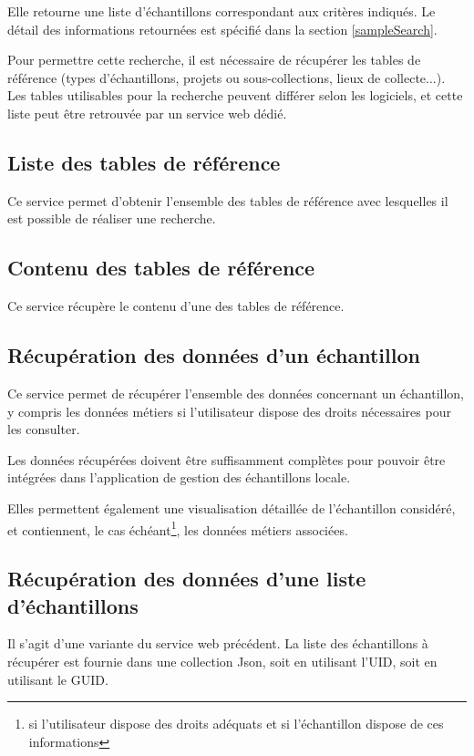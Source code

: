 Elle retourne une liste d'échantillons correspondant aux critères indiqués. Le détail des informations retournées est spécifié dans la section \ref{sampleSearch}.

Pour permettre cette recherche, il est nécessaire de récupérer les tables de référence (types d'échantillons, projets ou sous-collections, lieux de collecte...). Les tables utilisables pour la recherche peuvent différer selon les logiciels, et cette liste peut être retrouvée par un service web dédié.

\subsection{Liste des tables de référence}
Ce service permet d'obtenir l'ensemble des tables de référence avec lesquelles il est possible de réaliser une recherche.

\subsection{Contenu des tables de référence}
Ce service récupère le contenu d'une des tables de référence.

\subsection{Récupération des données d'un échantillon}
Ce service permet de récupérer l'ensemble des données concernant un échan\-tillon, y compris les données \og métiers \fg{} si l'utilisateur dispose des droits néces\-saires pour les consulter.

Les données récupérées doivent être suffisamment complètes pour pouvoir être intégrées dans l'application de gestion des échantillons locale.

Elles permettent également une visualisation détaillée de l'échantillon consi\-déré, et contiennent, le cas échéant\footnote{si l'utilisateur dispose des droits adéquats et si l'échantillon dispose de ces informations}, les données \og métiers \fg{} associées.

\subsection{Récupération des données d'une liste d'échantillons}

Il s'agit d'une variante du service web précédent. La liste des échantillons à récupérer est fournie dans une collection Json, soit en utilisant l'UID, soit en utilisant le GUID.

